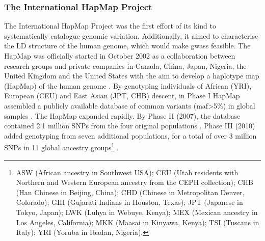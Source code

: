 \subsubsection{The International HapMap Project}

The International HapMap Project was the first effort of its kind to systematically catalogue genomic variation. 
Additionally, it aimed to characterise the LD structure of the human genome, which would make \glspl{gwas} feasible. 
The HapMap was officially started in October 2002 as a collaboration between research groups and private companies in Canada, China, Japan, Nigeria, the United Kingdom and the United States with the aim to develop a haplotype map (HapMap) of the human genome \cite{international2003international}.
By genotyping individuals of African (YRI), European (CEU) and East Asian (JPT, CHB) descent, in Phase I HapMap assembled a publicly available database of common variants (\gls{maf}>5\%) in global samples \cite{international2005haplotype}. 
The HapMap expanded rapidly. 
By Phase II (2007), the database contained 2.1 million SNPs from the four original populations \cite{international2007second}.
Phase III (2010) added genotyping from seven additional populations, for a total of over 3 million SNPs in 11 global ancestry groups\footnote{ASW (African ancestry in Southwest USA); CEU (Utah residents with Northern and Western European ancestry from the CEPH collection); CHB (Han Chinese in Beijing, China); CHD (Chinese in Metropolitan Denver, Colorado); GIH (Gujarati Indians in Houston, Texas); JPT (Japanese in Tokyo, Japan); LWK (Luhya in Webuye, Kenya); MEX (Mexican ancestry in Los Angeles, California); MKK (Maasai in Kinyawa, Kenya); TSI (Tuscans in Italy); YRI (Yoruba in Ibadan, Nigeria).} \cite{international2010integrating}.\\ 




